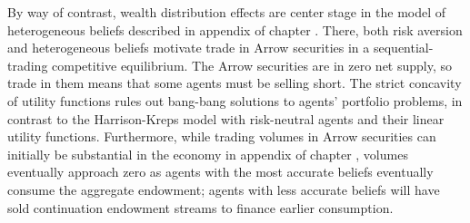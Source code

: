 By way of contrast, wealth distribution  effects 
are center stage in the model of  heterogeneous beliefs 
described in appendix  of chapter . There,  both risk aversion and  heterogeneous beliefs 
motivate trade in Arrow securities in a 
sequential-trading competitive equilibrium.
The Arrow securities are in zero net supply, so 
 trade in them means that some agents must be selling short. 
 The strict concavity of 
utility functions rules out  bang-bang solutions
to agents' portfolio problems, in contrast to the 
Harrison-Kreps model with risk-neutral agents and their
linear utility functions. Furthermore, while trading 
volumes in Arrow securities can initially be substantial 
in the economy in appendix  of 
chapter ,  volumes eventually
approach zero as agents with the most
accurate beliefs eventually  consume the 
aggregate endowment; agents with less 
accurate beliefs will  have sold  continuation endowment streams to finance earlier consumption.







